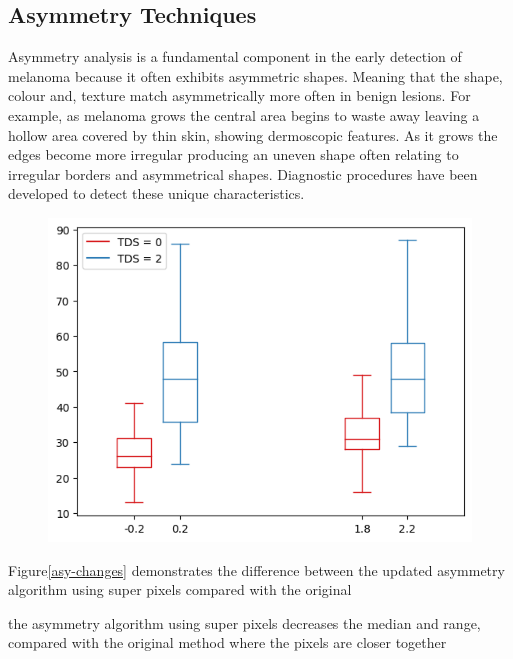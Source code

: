 \subsection{Asymmetry Techniques}
Asymmetry analysis is a fundamental component in the early detection of melanoma because it often exhibits asymmetric shapes\cite{Ali2020a}. Meaning that the shape, colour and, texture match asymmetrically more often in benign lesions. For example, as melanoma grows the central area begins to waste away leaving a hollow area covered by thin skin, showing dermoscopic features. As it grows the edges become more irregular producing an uneven shape often relating to irregular borders and asymmetrical shapes. Diagnostic procedures have been developed to detect these unique characteristics.

\begin{figure}
    \centering
    \caption{} 
\end{figure}\label{asy-examples}

\begin{figure}
    \centering
    \includegraphics[scale=1.2]{images/asymmetry/asy-changes.png}
    \caption{} 
\end{figure}\label{asy-changes}

Figure\ref{asy-changes} demonstrates the difference between the updated asymmetry algorithm using super pixels compared with the original

the asymmetry algorithm using super pixels decreases the median and range, compared with the original method where the pixels are closer together

